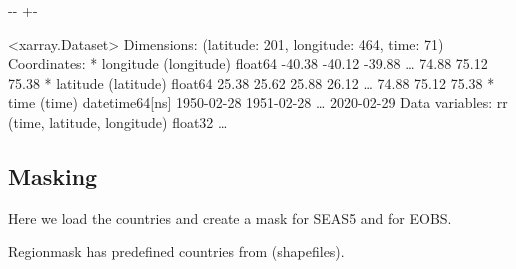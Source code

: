 \documentclass[letterpaper,10pt,english]{sphinxmanual}
\newlength\nbsphinxcodecellspacing
\begin{document}
{

\kern-\sphinxverbatimsmallskipamount\kern-\baselineskip
\kern+\FrameHeightAdjust\kern-\fboxrule
\vspace{\nbsphinxcodecellspacing}

\begin{sphinxVerbatim}[commandchars=\\\{\}]
\llap{\color{nbsphinxout}[5]:\,\hspace{\fboxrule}\hspace{\fboxsep}}<xarray.Dataset>
Dimensions:    (latitude: 201, longitude: 464, time: 71)
Coordinates:
  * longitude  (longitude) float64 -40.38 -40.12 -39.88 {\ldots} 74.88 75.12 75.38
  * latitude   (latitude) float64 25.38 25.62 25.88 26.12 {\ldots} 74.88 75.12 75.38
  * time       (time) datetime64[ns] 1950-02-28 1951-02-28 {\ldots} 2020-02-29
Data variables:
    rr         (time, latitude, longitude) float32 {\ldots}
\end{sphinxVerbatim}
}


\subsection{Masking}
\label{\detokenize{Notebooks/2.Preprocess/2.3Upscale:Masking}}
Here we load the countries and create a mask for SEAS5 and for EOBS.

Regionmask has predefined countries from  (shapefiles).

{
\begin{sphinxVerbatim}[commandchars=\\\{\}]
\llap{\color{nbsphinxin}[7]:\,\hspace{\fboxrule}\hspace{\fboxsep}}  
\end{sphinxVerbatim}
}
\end{document}
